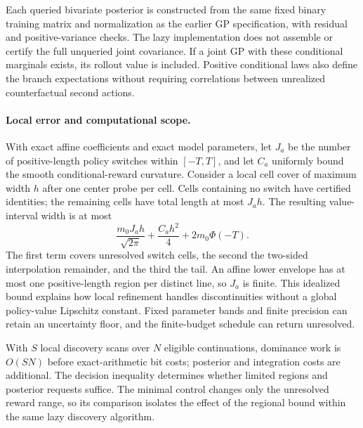 Each queried bivariate posterior is constructed from the same fixed binary training matrix and normalization as the earlier GP specification, with residual and positive-variance checks. The lazy implementation does not assemble or certify the full unqueried joint covariance. If a joint GP with these conditional marginals exists, its rollout value is included. Positive conditional laws also define the branch expectations without requiring correlations between unrealized counterfactual second actions. 

\paragraph{Local error and computational scope.}
With exact affine coefficients and exact model parameters, let $J_a$ be the number of positive-length policy switches within $[-T,T]$, and let $C_a$ uniformly bound the smooth conditional-reward curvature. Consider a local cell cover of maximum width $h$ after one center probe per cell. Cells containing no switch have certified identities; the remaining cells have total length at most $J_a h$. The resulting value-interval width is at most
\begin{equation}
\frac{m_0 J_a h}{\sqrt{2\pi}}+
\frac{C_a h^2}{4}+2m_0\Phi(-T).
\label{eq:lazy_local_error}
\end{equation}
The first term covers unresolved switch cells, the second the two-sided interpolation remainder, and the third the tail. An affine lower envelope has at most one positive-length region per distinct line, so $J_a$ is finite. This idealized bound explains how local refinement handles discontinuities without a global policy-value Lipschitz constant. Fixed parameter bands and finite precision can retain an uncertainty floor, and the finite-budget schedule can return unresolved.

With $S$ local discovery scans over $N$ eligible continuations, dominance work is $O(SN)$ before exact-arithmetic bit costs; posterior and integration costs are additional. The decision inequality determines whether limited regions and posterior requests suffice. The minimal control changes only the unresolved reward range, so its comparison isolates the effect of the regional bound within the same lazy discovery algorithm.
